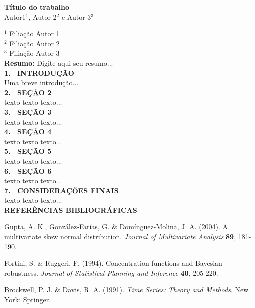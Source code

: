 \documentclass[12pt, a4paper]{article}
\begin{document}
%
\begin{center}
\textbf{Título do trabalho}\\[2em]
Autor1$^1$, Autor 2$^2$ e Autor 3$^3$\\[1em]
\end{center}
$^1$ Filiação Autor 1\\
$^2$ Filiação Autor 2\\
$^3$ Filiação Autor 3\\



\noindent \textbf{Resumo:} Digite aqui seu resumo... 
\\

\noindent \textbf{1. \ INTRODUÇÃO}\\
Uma breve introdução...
\\

\noindent \textbf{2. \ SEÇÃO 2}\\
texto texto texto...
\\

\noindent \textbf{3. \ SEÇÃO 3}\\
texto texto texto...
\\

\noindent \textbf{4. \ SEÇÃO 4}\\
texto texto texto...
\\

\noindent \textbf{5. \ SEÇÃO 5}\\
texto texto texto...
\\

\noindent \textbf{6. \ SEÇÃO 6}\\
texto texto texto...
\\

\noindent \textbf{7. \ CONSIDERAÇÕES FINAIS}\\
texto texto texto...
\\


\vspace{0.5cm} \noindent \textbf{REFERÊNCIAS BIBLIOGRÁFICAS}


\begin{description}

{\item[]Gupta, A. K., González-Farías, G. $\&$ Domínguez-Molina, J. A. (2004).
A multivariate skew normal distribution. {\it
Journal of Multivariate Analysis} {\bf 89}, 181-190.}

{\item[]Fortini, S. $\&$ Ruggeri, F. (1994). Concentration functions and Bayesian robustness. {\it Journal of Statistical Planning and Inference}
{\bf 40}, 205-220.}

{\item[]Brockwell, P. J. $\&$ Davis, R. A. (1991). {\it Time Series: Theory and Methods}. 
New York: Springer.}

\end{description}
\end{document}
